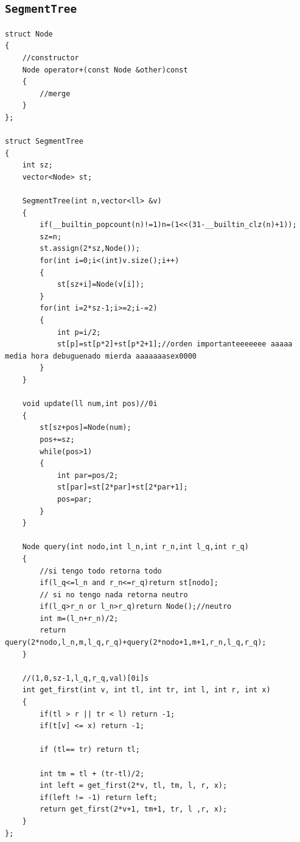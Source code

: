 \subsection{\texttt{SegmentTree}}
\begin{lstlisting}
struct Node
{
    //constructor
    Node operator+(const Node &other)const
    {
        //merge
    }
};

struct SegmentTree
{
    int sz;
    vector<Node> st;
 
    SegmentTree(int n,vector<ll> &v)
    {
        if(__builtin_popcount(n)!=1)n=(1<<(31-__builtin_clz(n)+1));
        sz=n;
        st.assign(2*sz,Node());
        for(int i=0;i<(int)v.size();i++)
        {
            st[sz+i]=Node(v[i]);
        }
        for(int i=2*sz-1;i>=2;i-=2)
        {
            int p=i/2;
            st[p]=st[p*2]+st[p*2+1];//orden importanteeeeeee aaaaa media hora debuguenado mierda aaaaaaasex0000
        }
    }
 
    void update(ll num,int pos)//0i
    {
        st[sz+pos]=Node(num);
        pos+=sz;
        while(pos>1)
        {
            int par=pos/2;
            st[par]=st[2*par]+st[2*par+1];
            pos=par;
        }
    }
 
    Node query(int nodo,int l_n,int r_n,int l_q,int r_q)
    {
        //si tengo todo retorna todo
        if(l_q<=l_n and r_n<=r_q)return st[nodo];
        // si no tengo nada retorna neutro
        if(l_q>r_n or l_n>r_q)return Node();//neutro
        int m=(l_n+r_n)/2;
        return query(2*nodo,l_n,m,l_q,r_q)+query(2*nodo+1,m+1,r_n,l_q,r_q);
    }
    
    //(1,0,sz-1,l_q,r_q,val)[0i]s
    int get_first(int v, int tl, int tr, int l, int r, int x) 
    {
        if(tl > r || tr < l) return -1;
        if(t[v] <= x) return -1;

        if (tl== tr) return tl;

        int tm = tl + (tr-tl)/2;
        int left = get_first(2*v, tl, tm, l, r, x);
        if(left != -1) return left;
        return get_first(2*v+1, tm+1, tr, l ,r, x);
    }
};
\end{lstlisting}

